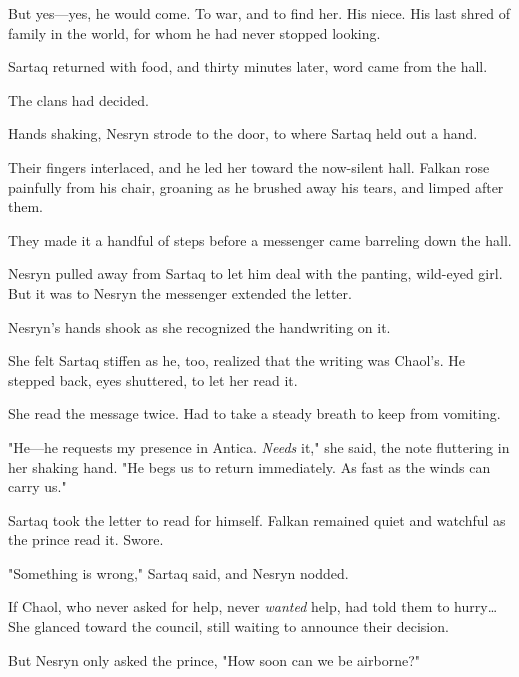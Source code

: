 But yes---yes, he would come.
To war, and to find her.
His niece.
His last shred of family in the world, for whom he had never stopped looking.

Sartaq returned with food, and thirty minutes later, word came from the hall.

The clans had decided.

Hands shaking, Nesryn strode to the door, to where Sartaq held out a hand.

Their fingers interlaced, and he led her toward the now-silent hall.
Falkan rose painfully from his chair, groaning as he brushed away his tears, and limped after them.

They made it a handful of steps before a messenger came barreling down the hall.

Nesryn pulled away from Sartaq to let him deal with the panting, wild-eyed girl.
But it was to Nesryn the messenger extended the letter.

Nesryn's hands shook as she recognized the handwriting on it.

She felt Sartaq stiffen as he, too, realized that the writing was Chaol's.
He stepped back, eyes shuttered, to let her read it.

She read the message twice.
Had to take a steady breath to keep from vomiting.

"He---he requests my presence in Antica.
\emph{Needs} it," she said, the note fluttering in her shaking hand.
"He begs us to return immediately.
As fast as the winds can carry us."

Sartaq took the letter to read for himself.
Falkan remained quiet and watchful as the prince read it.
Swore.

"Something is wrong," Sartaq said, and Nesryn nodded.

If Chaol, who never asked for help, never \emph{wanted} help, had told them to hurry\ldots She glanced toward the council, still waiting to announce their decision.

But Nesryn only asked the prince, "How soon can we be airborne?"

